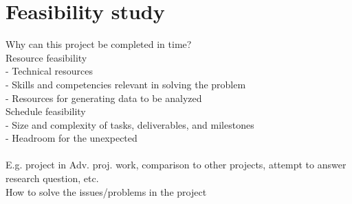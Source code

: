 \chapter{Feasibility study}
\label{chapter6:feasibility_study}


Why can this project be completed in time?  \\
Resource feasibility \\
- Technical resources \\
- Skills and competencies relevant in solving the problem  \\
- Resources for generating data to be analyzed  \\
Schedule feasibility \\
- Size and complexity of tasks, deliverables, and milestones \\
- Headroom for the unexpected \\ \\

E.g. project in Adv. proj. work, comparison to other projects, attempt to answer research question, etc. \\
How to solve the issues/problems in the project